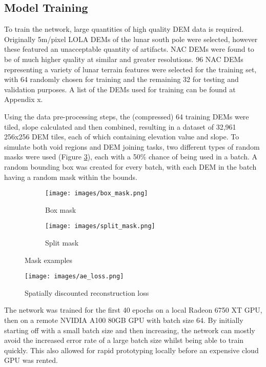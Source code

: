 \documentclass[twocolumn]{article}
\begin{document}
\subsection{Model Training}
\label{sec:orgc6edf29}

To train the network, large quantities of high quality DEM data is required.
Originally 5m/pixel LOLA DEMs of the lunar south pole were selected, however these featured an unacceptable quantity of artifacts.
NAC DEMs were found to be of much higher quality at similar and greater resolutions.
96 NAC DEMs\autocite{LROCRDRProduct} representing a variety of lunar terrain features were selected for the training set, with 64 randomly chosen for training and the remaining 32 for testing and validation purposes.
A list of the DEMs used for training can be found at Appendix x.

Using the data pre-processing steps, the (compressed) 64 training DEMs were tiled, slope calculated and then combined, resulting in a dataset of 32,961 256x256 DEM tiles, each of which containing elevation value and slope.
To simulate both void regions and DEM joining tasks, two different types of random masks were used (Figure \ref{fig:masks}), each with a 50\% chance of being used in a batch.
A random bounding box was created for every batch, with each DEM in the batch having a random mask within the bounds.

\begin{figure}
\centering
\begin{subfigure}{0.4\columnwidth}
    \caption{Box mask}
    \texttt{[image: images/box\_mask.png]}
    \label{fig:box_mask}
\end{subfigure}
\hfill
\begin{subfigure}{0.4\columnwidth}
    \caption{Split mask}
    \texttt{[image: images/split\_mask.png]}
    \label{fig:blended}
\end{subfigure}
\caption{\label{fig:masks}Mask examples}
\end{figure}

\begin{figure}[htbp]
\centering
\texttt{[image: images/ae\_loss.png]}
\caption{\label{fig:ae_loss}Spatially discounted reconstruction loss}
\end{figure}

The network was trained for the first 40 epochs on a local Radeon 6750 XT GPU, then on a remote NVIDIA A100 80GB GPU with batch size 64.
By initially starting off with a small batch size and then increasing, the network can mostly avoid the increased error rate of a large batch size whilst being able to train quickly\autocite{devarakondaAdaBatchAdaptiveBatch2018}.
This also allowed for rapid prototyping locally before an expensive cloud GPU was rented.
\end{document}
